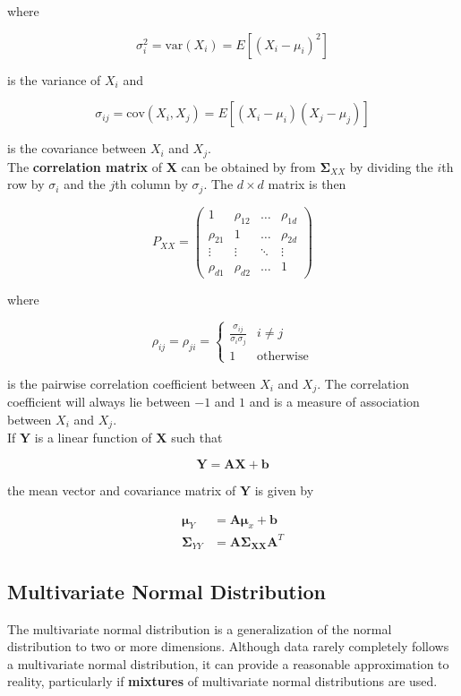 \documentclass[11pt]{article}
\theoremstyle{definition}
\begin{document}
where 

$$\sigma_i^2 = \text{var}(X_i) = E[(X_i - \mu_i)^2]$$

is the variance of $X_i$ and 

$$\sigma_{ij} = \text{cov}(X_i, X_j) = E[(X_i - \mu_i)(X_j - \mu_j)]$$

is the covariance between $X_i$ and $X_j$.  \\

The \textbf{correlation matrix} of $\mathbf{X}$ can be obtained by from $\mathbf{\Sigma}_{XX}$ by dividing the $i$th row by $\sigma_i$ and the $j$th column by $\sigma_j$.  The $d \times d$ matrix is then

$$P_{XX} = \begin{pmatrix}
    1 & \rho_{12} & \dots  & \rho_{1d}\\
    \rho_{21} & 1  & \dots  & \rho_{2d}\\
    \vdots & \vdots  & \ddots & \vdots \\
    \rho_{d1} & \rho_{d2}  & \dots  & 1
\end{pmatrix}$$

where 

$$\rho_{ij} = \rho_{ji} = \begin{cases}
\frac{\sigma_{ij}}{\sigma_i \sigma_j} & i \neq j\\
1 & \text{otherwise}
\end{cases}
$$

is the pairwise correlation coefficient between $X_i$ and $X_j$.  The correlation coefficient will always lie between $-1$ and $1$ and is a measure of association between $X_i$ and $X_j$.\\

If $\mathbf{Y}$ is a linear function of $\mathbf{X}$ such that

$$\mathbf{Y} = \mathbf{AX} + \mathbf{b}$$

the mean vector and covariance matrix of $\mathbf{Y}$ is given by

\begin{align*}
\mathbf{\mu}_Y &= \mathbf{A\mu}_x + \mathbf{b}\\
\mathbf{\Sigma}_{YY} &= \mathbf{A\Sigma_{XX}A}^T
\end{align*}
\subsection{Multivariate Normal Distribution}
The multivariate normal distribution is a generalization of the normal distribution to two or more dimensions.  Although data rarely completely follows a multivariate normal distribution, it can provide a reasonable approximation to reality, particularly if \textbf{mixtures} of multivariate normal distributions are used.\\
\end{document}
